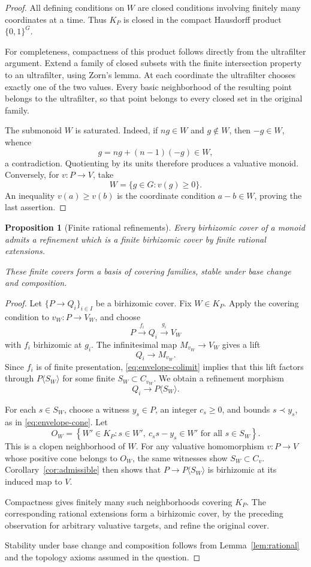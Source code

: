 \documentclass[11pt]{article}
\newtheorem{proposition}[theorem]{Proposition}
\theoremstyle{definition}
\theoremstyle{remark}
\begin{document}
\begin{proof}
All defining conditions on \(W\) are closed conditions involving
finitely many coordinates at a time. Thus \(K_P\) is closed in the
compact Hausdorff product \(\{0,1\}^G\).

For completeness, compactness of this product follows directly
from the ultrafilter argument. Extend a family of closed subsets
with the finite intersection property to an ultrafilter, using
Zorn's lemma. At each coordinate the ultrafilter chooses exactly
one of the two values. Every basic neighborhood of the resulting
point belongs to the ultrafilter, so that point belongs to every
closed set in the original family.

The submonoid \(W\) is saturated. Indeed, if \(ng\in W\) and
\(g\notin W\), then \(-g\in W\), whence
\[
g=ng+(n-1)(-g)\in W,
\]
a contradiction. Quotienting by its units therefore produces a
valuative monoid. Conversely, for \(v:P\to V\), take
\[
W=\{g\in G:v(g)\ge0\}.
\]
An inequality \(v(a)\ge v(b)\) is the coordinate condition
\(a-b\in W\), proving the last assertion.
\end{proof}

\begin{proposition}[Finite rational refinements]\label{prop:refinement}
Every birhizomic cover of a monoid admits a refinement which is a
finite birhizomic cover by finite rational extensions.

These finite covers form a basis of covering families, stable
under base change and composition.
\end{proposition}

\begin{proof}
Let \(\{P\to Q_i\}_{i\in I}\) be a birhizomic cover.
Fix \(W\in K_P\). Apply the covering condition to
\(v_W:P\to V_W\), and choose
\[
P\xrightarrow{f_i}Q_i\xrightarrow{g_i}V_W
\]
with \(f_i\) birhizomic at \(g_i\).
The infinitesimal map \(M_{v_W}\to V_W\) gives a lift
\[
Q_i\longrightarrow M_{v_W}.
\]
Since \(f_i\) is of finite presentation,
\eqref{eq:envelope-colimit} implies that this lift factors through
\(P\langle S_W\rangle\) for some finite \(S_W\subset C_{v_W}\).
We obtain a refinement morphism
\[
Q_i\longrightarrow P\langle S_W\rangle.
\]

For each \(s\in S_W\), choose a witness \(y_s\in P\), an integer
\(c_s\ge0\), and bounds \(s\prec y_s\), as in
\eqref{eq:envelope-cone}. Let
\[
O_W=
\left\{
W'\in K_P:
s\in W',\ c_s s-y_s\in W'
\text{ for all }s\in S_W
\right\}.
\]
This is a clopen neighborhood of \(W\).
For any valuative homomorphism \(v:P\to V\) whose positive cone
belongs to \(O_W\), the same witnesses show \(S_W\subset C_v\).
Corollary~\ref{cor:admissible} then shows that
\(P\to P\langle S_W\rangle\) is birhizomic at its induced map to
\(V\).

Compactness gives finitely many such neighborhoods covering
\(K_P\). The corresponding rational extensions form a birhizomic
cover, by the preceding observation for arbitrary valuative
targets, and refine the original cover.

Stability under base change and composition follows from
Lemma~\ref{lem:rational} and the topology axioms assumed in the
question.
\end{proof}
\end{document}
